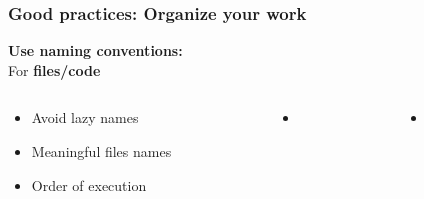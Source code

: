 \documentclass[xcolor=x11names,compress]{beamer}
\renewcommand{\(}{\begin{columns}}
\renewcommand{\)}{\end{columns}}
\newcommand{\<}[1]{\begin{column}{#1}}
\renewcommand{\>}{\end{column}}
\begin{document}
\begin{frame}
\frametitle{\textbf{Good practices:} Organize your work }
\textcolor{siap}{\textbf{Use naming conventions: } \\ }
For \textbf{files/code}\\
\begin{columns}[t]
 \begin{column}{0.3\textwidth}
    \begin{itemize}[<+->]
   \item Avoid  lazy names
   \item Meaningful files names
   \item Order of execution
    \end{itemize}
\end{column}
  \begin{column}{0.2\textwidth}
    \begin{itemize}
       \item[]
    \end{itemize}
  \end{column}
  \begin{column}{0.5\textwidth}
    \begin{itemize}
        \item[]

    \end{itemize}
  \end{column}
\end{columns}
\end{frame}
\end{document}
